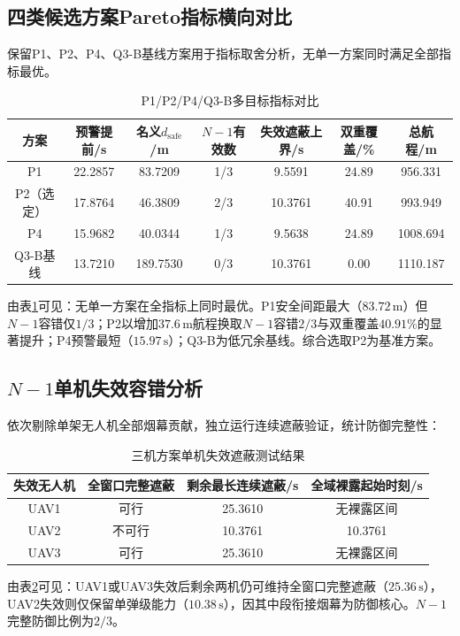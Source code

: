 \documentclass[withoutpreface,bwprint]{cumcmthesis}
\renewcommand{\textbf}[1]{{\song\bfseries #1}}
\begin{document}
\subsection{四类候选方案Pareto指标横向对比}
保留P1、P2、P4、Q3-B基线方案用于指标取舍分析，无单一方案同时满足全部指标最优。
\begin{table}[htbp]
	\centering
	\caption{P1/P2/P4/Q3-B多目标指标对比}
	\label{tab:comparison}
	\begin{tabularx}{\textwidth}{c c c c c c c}
		\toprule
		\textbf{方案} & 预警提前/s & 名义$d_{\text{safe}}$/m & $N-1$有效数 & 失效遮蔽上界/s & 双重覆盖/\% & 总航程/m \\
		\midrule
		P1 & 22.2857 & 83.7209 & 1/3 & 9.5591 & 24.89 & 956.331 \\
		P2（选定） & 17.8764 & 46.3809 & 2/3 & 10.3761 & 40.91 & 993.949 \\
		P4 & 15.9682 & 40.0344 & 1/3 & 9.5638 & 24.89 & 1008.694 \\
		Q3-B基线 & 13.7210 & 189.7530 & 0/3 & 10.3761 & 0.00 & 1110.187 \\
		\bottomrule
	\end{tabularx}
\end{table}

由表\ref{tab:comparison}可见：无单一方案在全指标上同时最优。P1安全间距最大（$83.72\,\text{m}$）但$N-1$容错仅$1/3$；P2以增加$37.6\,\text{m}$航程换取$N-1$容错$2/3$与双重覆盖$40.91\%$的显著提升；P4预警最短（$15.97\,\text{s}$）；Q3-B为低冗余基线。综合选取P2为基准方案。

\subsection{$N-1$单机失效容错分析}
依次剔除单架无人机全部烟幕贡献，独立运行连续遮蔽验证，统计防御完整性：
\begin{table}[htbp]
	\centering
	\caption{三机方案单机失效遮蔽测试结果}
	\label{tab:failure}
	\begin{tabularx}{\textwidth}{c c c c}
		\toprule
		\textbf{失效无人机} & 全窗口完整遮蔽 & 剩余最长连续遮蔽/s & 全域裸露起始时刻/s \\
		\midrule
		UAV1 & 可行 & 25.3610 & 无裸露区间 \\
		UAV2 & 不可行 & 10.3761 & 10.3761 \\
		UAV3 & 可行 & 25.3610 & 无裸露区间 \\
		\bottomrule
	\end{tabularx}
\end{table}

由表\ref{tab:failure}可见：UAV1或UAV3失效后剩余两机仍可维持全窗口完整遮蔽（$25.36\,\text{s}$），UAV2失效则仅保留单弹级能力（$10.38\,\text{s}$），因其中段衔接烟幕为防御核心。$N-1$完整防御比例为$2/3$。
\end{document}
